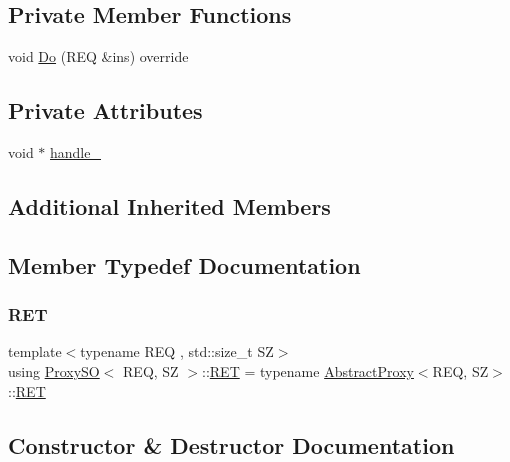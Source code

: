 \subsection*{Private Member Functions}
\begin{DoxyCompactItemize}
\item 
void \hyperlink{classProxySO_aea9532d196e05f80b2dd0de425df711f}{Do} (R\+EQ \&ins) override
\end{DoxyCompactItemize}
\subsection*{Private Attributes}
\begin{DoxyCompactItemize}
\item 
void $\ast$ \hyperlink{classProxySO_a8db0f87ceb9dc54bd30b212394a74d09}{handle\+\_\+}
\end{DoxyCompactItemize}
\subsection*{Additional Inherited Members}


\subsection{Member Typedef Documentation}
\mbox{\label{classProxySO_aab633f27d11bc301d3fe6714293cdff9}} 
\subsubsection{\texorpdfstring{R\+ET}{RET}}
{\footnotesize\ttfamily template$<$typename R\+EQ , std\+::size\+\_\+t SZ$>$ \\
using \hyperlink{classProxySO}{Proxy\+SO}$<$ R\+EQ, SZ $>$\+::\hyperlink{classAbstractProxy_ab2af611a27c14916a27d0e9249f0291b}{R\+ET} =  typename \hyperlink{classAbstractProxy}{Abstract\+Proxy}$<$R\+EQ, SZ$>$\+::\hyperlink{classAbstractProxy_ab2af611a27c14916a27d0e9249f0291b}{R\+ET}\hspace{0.3cm}{\ttfamily [private]}}



\subsection{Constructor \& Destructor Documentation}
\mbox{\label{classProxySO_a75fcf01c02b0aae33be41eea99a8b3e3}} 
